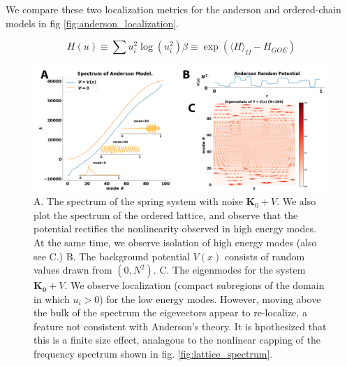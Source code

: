 \documentclass{article}
\begin{document}
We compare these two localization metrics for the anderson and ordered-chain models in fig \ref{fig:anderson_localization}.

\begin{subequations}
	\begin{equation}\label{eq:localization_metric_ind}
	H \left( u \right)\equiv \sum u_i ^2 \log{\left( u_i^2 \right)}
\end{equation}
\begin{equation}
	\beta \equiv \exp{\left( \langle H \rangle_\Omega - H_{GOE} \right)}
\end{equation}
\label{eq:localization_metric}
\end{subequations}

\begin{figure}
	\begin{center}
\includegraphics[width=\textwidth]{Figures/anderson_spectrum_and_eigenvector.png}
\end{center}
\caption{
	A. The spectrum of the spring system with noise $\bm{K}_0 + V$. 
	We also plot the spectrum of the ordered lattice, and observe that the potential rectifies the
	nonlinearity observed in high energy modes.
	At the same time, we observe isolation of high energy modes (also see C.)
	B. The background potential $V(x)$ consists of random values drawn from $(0, N^2)$.
	C. The eigenmodes for the system $\bm{K_0} + V$. 
	We observe localization (compact subregions of the domain in which $u_i>0$) for the low energy modes.
	However, moving above the bulk of the spectrum the eigevectors appear to re-localize, a feature not consistent with 
	Anderson's theory.
	It is hpothesized that this is a finite size effect, analagous to the nonlinear capping of the 
	frequency spectrum shown in fig. \ref{fig:lattice_spectrum}.
}
\label{fig:anderson_eigenvalues}
\end{figure}
\end{document}
